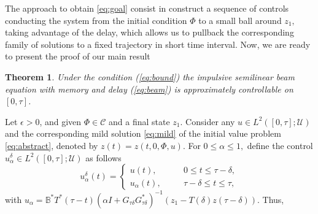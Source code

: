 \documentclass[11 pt]{amsart}
\newtheorem{teo}{\sc Theorem}[section]
\begin{document}
The approach to obtain \eqref{eq:goal} consist in construct a sequence of controls conducting the system from the initial condition $\Phi$ to a small ball around $z_1,$ taking advantage of the delay, which  allows us to pullback the corresponding family of  solutions to a fixed trajectory in short time interval. Now, we are ready to present the proof of our main result

\begin{teo} \label{main}
Under the condition (\ref{eq:bound}) the impulsive semilinear beam equation with memory and delay (\ref{eq:beam}) is approximately
controllable on $[0,\tau]$.
\end{teo}
{ \mbox{}} Let $\epsilon>0$, and given $\Phi\in \mathcal{C}$ and a final state $z_{1}$.  Consider any $u\in L^{2}([0,\tau];{\mathcal{U}})$ and the corresponding mild solution \eqref{eq:mild}  of the initial value problem \eqref{eq:abstract}, denoted by $z(t)=z(t,0,\Phi,u)$. For $0\leq\alpha \leq 1,$ define the control $u_{\alpha}^{\delta}\in L^{2}([0,\tau];{\mathcal{U}})$  as follows
$$
u_{\alpha}^{\delta}(t)=\left\{\begin{array}{ccl}
                         u(t), &&0\leq t\leq \tau-\delta, \\
                         u_{\alpha}(t), &\quad& \tau-\delta\leq t\leq \tau,
                       \end{array}\right.
$$
with $
u_{\alpha}= {\mathbb{B}}^{*}T^{*}(\tau-t)(\alpha I+ G_{\tau\delta}G_{\tau\delta}^{*})^{-1}(z_{1} - T(\delta)z(\tau-\delta)).
$
Thus,
\end{document}
